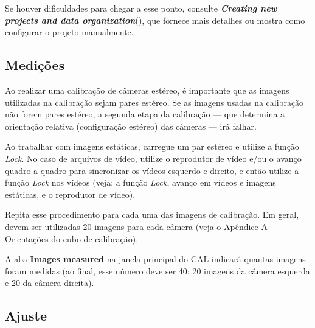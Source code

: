 \documentclass[
  12pt,
  letterpaper,
  DIV=11,
  numbers=noendperiod]{scrreprt}
\begin{document}
\begin{tcolorbox}[enhanced jigsaw, colframe=quarto-callout-note-color-frame, toprule=.15mm, opacitybacktitle=0.6, opacityback=0, bottomtitle=1mm, colback=white, coltitle=black, left=2mm, toptitle=1mm, titlerule=0mm, leftrule=.75mm, title=\textcolor{quarto-callout-note-color}{\faInfo}\hspace{0.5em}{Note}, rightrule=.15mm, arc=.35mm, breakable, bottomrule=.15mm, colbacktitle=quarto-callout-note-color!10!white]

Se houver dificuldades para chegar a esse ponto, consulte
\textbf{\emph{Creating new projects and data organization}}(), que
fornece mais detalhes ou mostra como configurar o projeto manualmente.

\end{tcolorbox}

\subsection{Medições}\label{mediuxe7uxf5es}

Ao realizar uma calibração de câmeras estéreo, é importante que as
imagens utilizadas na calibração sejam pares estéreo. Se as imagens
usadas na calibração não forem pares estéreo, a segunda etapa da
calibração --- que determina a orientação relativa (configuração
estéreo) das câmeras --- irá falhar.

Ao trabalhar com imagens estáticas, carregue um par estéreo e utilize a
função \emph{Lock}. No caso de arquivos de vídeo, utilize o reprodutor
de vídeo e/ou o avanço quadro a quadro para sincronizar os vídeos
esquerdo e direito, e então utilize a função \emph{Lock} nos vídeos
(veja: a função \emph{Lock}, avanço em vídeos e imagens estáticas, e o
reprodutor de vídeo).

Repita esse procedimento para cada uma das imagens de calibração. Em
geral, devem ser utilizadas 20 imagens para cada câmera (veja o Apêndice
A --- Orientações do cubo de calibração).

A aba \textbf{Images measured} na janela principal do CAL indicará
quantas imagens foram medidas (ao final, esse número deve ser 40: 20
imagens da câmera esquerda e 20 da câmera direita).

\subsection{Ajuste}\label{ajuste}
\end{document}
